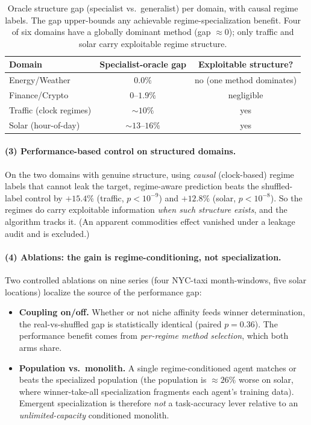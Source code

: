 \documentclass{article}
\begin{document}
\begin{table}[t]
\centering
\small
\caption{Oracle structure gap (specialist vs.\ generalist) per domain, with
causal regime labels. The gap upper-bounds any achievable regime-specialization
benefit. Four of six domains have a globally dominant method (gap $\approx 0$);
only traffic and solar carry exploitable regime structure.}
\label{tab:oracle}
\begin{tabular}{lcc}
\toprule
\textbf{Domain} & \textbf{Specialist-oracle gap} & \textbf{Exploitable structure?} \\
\midrule
Energy/Weather & $0.0\%$ & no (one method dominates) \\
Finance/Crypto & $0\text{--}1.9\%$ & negligible \\
Traffic (clock regimes) & $\sim 10\%$ & yes \\
Solar (hour-of-day) & $\sim 13\text{--}16\%$ & yes \\
\bottomrule
\end{tabular}
\end{table}

\paragraph{(3) Performance-based control on structured domains.} On the two
domains with genuine structure, using \emph{causal} (clock-based) regime labels
that cannot leak the target, regime-aware prediction beats the shuffled-label
control by $+15.4\%$ (traffic, $p<10^{-9}$) and $+12.8\%$ (solar, $p<10^{-8}$).
So the regimes do carry exploitable information \emph{when such structure
exists}, and the algorithm tracks it. (An apparent commodities effect vanished
under a leakage audit and is excluded.)

\paragraph{(4) Ablations: the gain is regime-conditioning, not specialization.}
Two controlled ablations on nine series (four NYC-taxi month-windows, five solar
locations) localize the source of the performance gap:
\begin{itemize}
    \item \textbf{Coupling on/off.} Whether or not niche affinity feeds winner
    determination, the real-vs-shuffled gap is statistically identical (paired
    $p = 0.36$). The performance benefit comes from \emph{per-regime method
    selection}, which both arms share.
    \item \textbf{Population vs.\ monolith.} A single regime-conditioned agent
    matches or beats the specialized population (the population is $\approx 26\%$
    worse on solar, where winner-take-all specialization fragments each agent's
    training data). Emergent specialization is therefore \emph{not} a
    task-accuracy lever relative to an \emph{unlimited-capacity} conditioned
    monolith.
\end{itemize}
\end{document}
